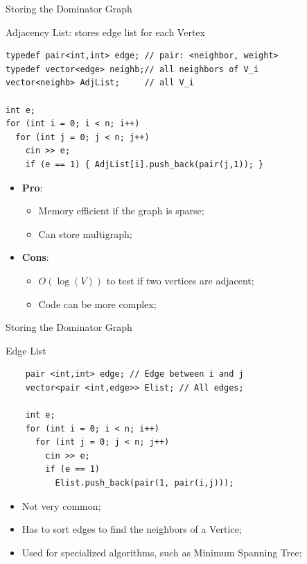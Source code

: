 \begin{frame}[fragile]{Storing the Dominator Graph}


  \begin{block}{Adjacency List: stores edge list for each Vertex}
      {\smaller
\begin{verbatim}
typedef pair<int,int> edge; // pair: <neighbor, weight>
typedef vector<edge> neighb;// all neighbors of V_i
vector<neighb> AdjList;     // all V_i

int e;
for (int i = 0; i < n; i++)
  for (int j = 0; j < n; j++)
    cin >> e;
    if (e == 1) { AdjList[i].push_back(pair(j,1)); }
\end{verbatim}}

\begin{itemize}
  \item {\bf Pro}:
    \begin{itemize}
      \item Memory efficient if the graph is sparse;
      \item Can store multigraph;
    \end{itemize}
  \item {\bf Cons}:
  \begin{itemize}
    \item $O(\log(V))$ to test if two vertices are adjacent;
    \item Code can be more complex;
  \end{itemize}
\end{itemize}
  \end{block}
\end{frame}

\begin{frame}[fragile]{Storing the Dominator Graph}
  \begin{block}{Edge List}
    \begin{verbatim}
    pair <int,int> edge; // Edge between i and j
    vector<pair <int,edge>> Elist; // All edges;

    int e;
    for (int i = 0; i < n; i++)
      for (int j = 0; j < n; j++)
        cin >> e;
        if (e == 1)
          Elist.push_back(pair(1, pair(i,j)));
    \end{verbatim}
    \begin{itemize}
      \item Not very common;
      \item Has to sort edges to find the neighbors of a Vertice;
      \item Used for specialized algorithms, such as Minimum Spanning Tree;
    \end{itemize}
  \end{block}
\end{frame}



